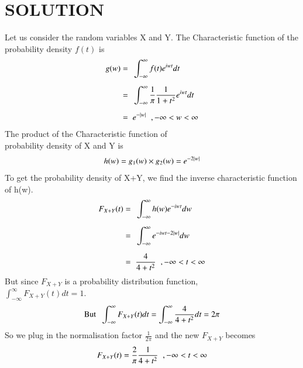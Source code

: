 \documentclass[journal,12pt,twocolumn]{IEEEtran}
\begin{document}
    \section*{SOLUTION}
    Let us consider the random variables X and Y.
    The Characteristic function of the probability density $f(t)$ is
    \begin{align}
        g(w) =\hspace{0.2cm} & \int_{-\infty}^{\infty}  f(t) {e}^{iwt} dt                                         \\[0.2cm]
        =\hspace{0.2cm}      & \int_{-\infty}^{\infty}  \displaystyle\frac{1}{\pi} \frac{1}{1+{t}^2} {e}^{iwt} dt \\[0.2cm]
        =\hspace{0.2cm}      & e^{-\vert w\vert}\hspace{0.2cm}, -\infty<w<\infty
    \end{align}
    The product of the Characteristic function of \\probability density of X and Y is
    \begin{align}
        h(w) = g_1(w) \times g_2(w) = {e}^{-2\vert w\vert}
    \end{align}
    To get the probability density of X+Y, we find the inverse characteristic function of h(w).
    \begin{align}
        F_{X+Y}(t) =\hspace{0.2cm} & \int_{-\infty}^{\infty} h(w) {e}^{-iwt} dw           \\[0.2cm]
        =\hspace{0.2cm}            & \int_{-\infty}^{\infty} {e}^{-iwt-2\vert w\vert} dw       \\[0.2cm]
        =\hspace{0.2cm}            & \frac{4}{4 + {t}^2} \hspace{0.2cm}, -\infty<t<\infty
    \end{align}
    But since $F_{X+Y}$ is a probability distribution function,\\[0.2cm]$\displaystyle\int_{-\infty}^{\infty} F_{X+Y}(t) dt= 1$.
    \begin{align}
        \text{But}\hspace{0.2cm} \int_{-\infty}^{\infty} F_{X+Y}(t) dt = \int_{-\infty}^{\infty} \frac{4}{4+{t^2}} dt= 2\pi
    \end{align}
    So we plug in the normalisation factor $\displaystyle\frac{1}{2\pi}$ and the new $F_{X+Y}$ becomes
    \begin{align}
        F_{X+Y}(t) = \frac{2}{\pi} \frac{1}{4+{t}^2}\hspace{0.2cm}, -\infty<t<\infty
    \end{align}
\end{document}
